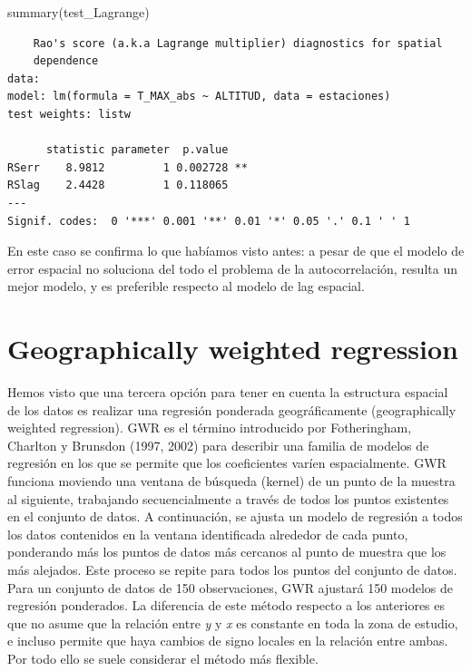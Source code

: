 \documentclass[
  letterpaper,
  DIV=11,
  numbers=noendperiod]{scrreprt}
\newenvironment{Shaded}{\begin{snugshade}}{\end{snugshade}}
\newcommand{\FunctionTok}[1]{\textcolor[rgb]{0.28,0.35,0.67}{#1}}
\newcommand{\NormalTok}[1]{\textcolor[rgb]{0.00,0.23,0.31}{#1}}
\begin{document}
\begin{Shaded}
\begin{Highlighting}[]
\FunctionTok{summary}\NormalTok{(test\_Lagrange)}
\end{Highlighting}
\end{Shaded}

\begin{verbatim}
    Rao's score (a.k.a Lagrange multiplier) diagnostics for spatial
    dependence
data:  
model: lm(formula = T_MAX_abs ~ ALTITUD, data = estaciones)
test weights: listw
 
      statistic parameter  p.value   
RSerr    8.9812         1 0.002728 **
RSlag    2.4428         1 0.118065   
---
Signif. codes:  0 '***' 0.001 '**' 0.01 '*' 0.05 '.' 0.1 ' ' 1
\end{verbatim}

En este caso se confirma lo que habíamos visto antes: a pesar de que el
modelo de error espacial no soluciona del todo el problema de la
autocorrelación, resulta un mejor modelo, y es preferible respecto al
modelo de lag espacial.

\hypertarget{geographically-weighted-regression}{%
\section{Geographically weighted
regression}\label{geographically-weighted-regression}}

Hemos visto que una tercera opción para tener en cuenta la estructura
espacial de los datos es realizar una regresión ponderada
geográficamente (geographically weighted regression). GWR es el término
introducido por Fotheringham, Charlton y Brunsdon (1997, 2002) para
describir una familia de modelos de regresión en los que se permite que
los coeficientes varíen espacialmente. GWR funciona moviendo una ventana
de búsqueda (kernel) de un punto de la muestra al siguiente, trabajando
secuencialmente a través de todos los puntos existentes en el conjunto
de datos. A continuación, se ajusta un modelo de regresión a todos los
datos contenidos en la ventana identificada alrededor de cada punto,
ponderando más los puntos de datos más cercanos al punto de muestra que
los más alejados. Este proceso se repite para todos los puntos del
conjunto de datos. Para un conjunto de datos de 150 observaciones, GWR
ajustará 150 modelos de regresión ponderados. La diferencia de este
método respecto a los anteriores es que no asume que la relación entre
\emph{y} y \emph{x} es constante en toda la zona de estudio, e incluso
permite que haya cambios de signo locales en la relación entre ambas.
Por todo ello se suele considerar el método más flexible.
\end{document}
